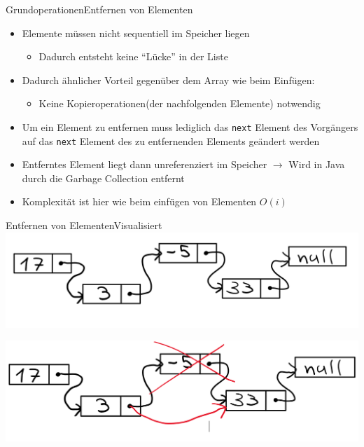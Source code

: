\begin{frame}{Grundoperationen}{Entfernen von Elementen}
	\begin{itemize}
		\item Elemente müssen nicht sequentiell im Speicher liegen
		\begin{itemize}
			\item Dadurch entsteht keine "`Lücke"' in der Liste
		\end{itemize}
		\item Dadurch ähnlicher Vorteil gegenüber dem Array wie beim Einfügen:
		\begin{itemize}
			\item Keine Kopieroperationen(der nachfolgenden Elemente) notwendig
		\end{itemize}
		\item Um ein Element zu entfernen muss lediglich das \texttt{next} Element des Vorgängers auf das \texttt{next} Element des
		zu entfernenden Elements geändert werden
		\item Entferntes Element liegt dann unreferenziert im Speicher $\rightarrow$ Wird in Java durch die Garbage Collection entfernt
		\item Komplexität ist hier wie beim einfügen von Elementen $O(i)$
	\end{itemize}
\end{frame}

\begin{frame}{Entfernen von Elementen}{Visualisiert}
\includegraphics[width=.8\textwidth]{graph/llist_remove_pre}

\includegraphics[width=.8\textwidth]{graph/llist_remove_post}
\end{frame}

